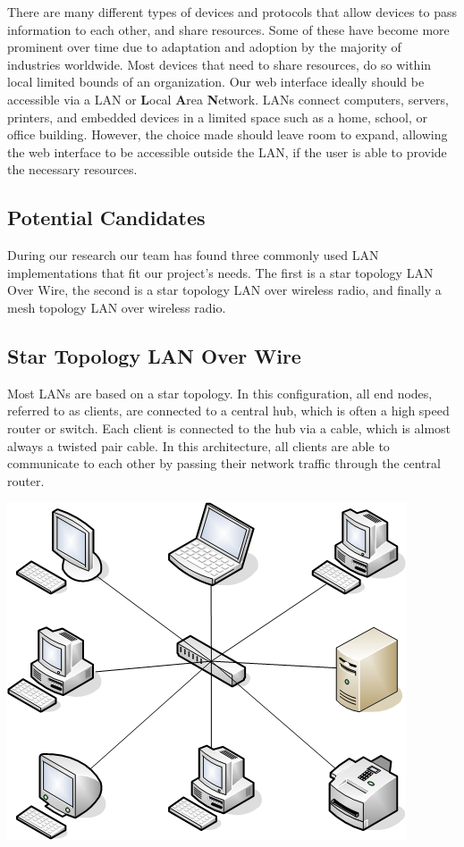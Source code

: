 \documentclass[onecolumn, draftclsnofoot,10pt, compsoc]{IEEEtran}
\begin{document}
		There are many different types of devices and protocols that allow devices to pass information to each other, and share resources.
		Some of these have become more prominent over time due to adaptation and adoption by the majority of industries worldwide.
		Most devices that need to share resources, do so within local limited bounds of an organization.
		Our web interface ideally should be accessible via a LAN or \textbf{L}ocal \textbf{A}rea \textbf{N}etwork.
		LANs connect computers, servers, printers, and embedded devices in a limited space such as a home, school, or office building. \cite{LAN1}
		However, the choice made should leave room to expand, allowing the web interface to be accessible outside the LAN, if the user is able to provide the necessary resources.

		\subsection{Potential Candidates}
		During our research our team has found three commonly used LAN implementations that fit our project's needs.
		The first is a star topology LAN Over Wire, the second is a star topology LAN over wireless radio, and finally a mesh topology LAN over wireless radio.

		\subsection{Star Topology LAN Over Wire}
		Most LANs are based on a star topology.  In this configuration, all end nodes, referred to as clients, are connected to a central hub, which is often a high speed router or switch.
		Each client is connected to the hub via a cable, which is almost always a twisted pair cable.  \cite{LAN2}
		In this architecture, all clients are able to communicate to each other by passing their network traffic through the central router.

		\begin{center}
			\includegraphics[scale=0.5]{Star_Topology.png}
		\end{center}
\end{document}
